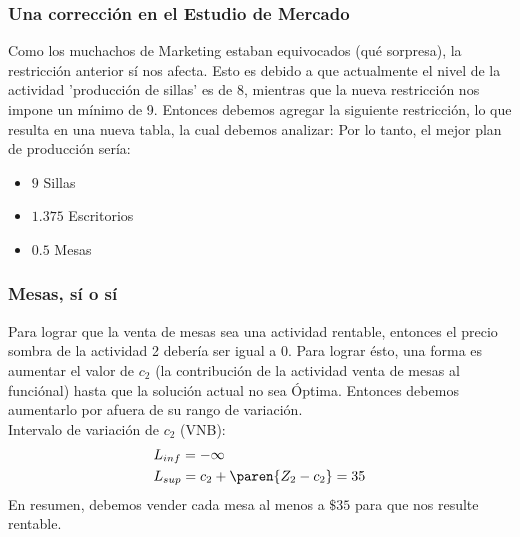 \begin{homeworkProblem}[1][Dakota]
\subsubsection{Una corrección en el Estudio de Mercado}
Como los muchachos de Marketing estaban equivocados (qué sorpresa), la restricción anterior sí nos afecta. Esto es debido a que actualmente el nivel de la actividad 'producción de sillas' es de 8, mientras que la nueva restricción nos impone un mínimo de 9.
Entonces debemos agregar la siguiente restricción,
lo que resulta en una nueva tabla, la cual debemos analizar:
\pagebreak
Por lo tanto, el mejor plan de producción sería:
\begin{itemize}
	\item $9$ Sillas
	\item $1.375$ Escritorios
	\item $0.5$ Mesas
\end{itemize}


\subsubsection{Mesas, sí o sí}
Para lograr que la venta de mesas sea una actividad rentable, entonces el precio sombra de la actividad 2 debería ser igual a $0$. Para lograr ésto, una forma es aumentar el valor de $c_2$ (la contribución de la actividad venta de mesas al funciónal) hasta que la solución actual no sea Óptima. Entonces debemos aumentarlo por afuera de su rango de variación. \\
Intervalo de variación de $c_2$ (VNB):
\begin{align*}
  &L_{inf} = -\infty \\
  &L_{sup} = c_2 + \paren{Z_2 - c_2} = 35  
\end{align*}
En resumen, debemos vender cada mesa al menos a $\$35$ para que nos resulte rentable.
\end{homeworkProblem}